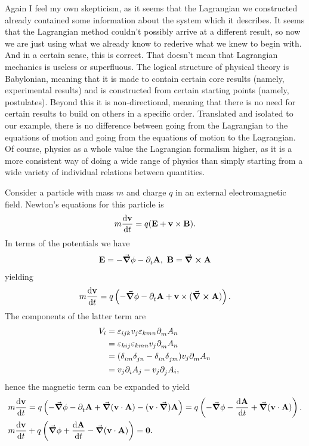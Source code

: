 Again I feel my own skepticism, as it seems that the Lagrangian we constructed already contained some information about the system which it describes. It seems that the Lagrangian method couldn't possibly arrive at a different result, so now we are just using what we already know to rederive what we knew to begin with. And in a certain sense, this is correct. That doesn't mean that Lagrangian mechanics is useless or superfluous. The logical structure of physical theory is Babylonian, meaning that it is made to contain certain core results (namely, experimental results) and is constructed from certain starting points (namely, postulates). Beyond this it is non-directional, meaning that there is no need for certain results to build on others in a specific order. Translated and isolated to our example, there is no difference between going from the Lagrangian to the equations of motion and going from the equations of motion to the Lagrangian. Of course, physics as a whole value the Lagrangian formalism higher, as it is a more consistent way of doing a wide range of physics than simply starting from a wide variety of individual relations between quantities.

Consider a particle with mass $m$ and charge $q$ in an external electromagnetic field. Newton's equations for this particle is
\begin{align*}
	m\dv{\vb{v}}{t} = q(\vb{E} + \vb{v}\times\vb{B}).
\end{align*}
In terms of the potentials we have
\begin{align*}
	\vb{E} = -\grad{\phi} - \partial^{}_{t}\vb{A},\ \vb{B} = \curl{\vb{A}}
\end{align*}
yielding
\begin{align*}
	m\dv{\vb{v}}{t} = q\left(-\grad{\phi} - \partial^{}_{t}\vb{A} + \vb{v}\times(\curl{\vb{A}})\right).
\end{align*}
The components of the latter term are
\begin{align}
	V_{i} &= \varepsilon_{ijk}v_{j}\varepsilon_{kmn}\partial^{}_{m}A_{n} \\
	      &= \varepsilon_{kij}\varepsilon_{kmn}v_{j}\partial^{}_{m}A_{n} \\
	      &= (\delta_{im}^{}\delta_{jn}^{} - \delta_{in}^{}\delta_{jm}^{})v_{j}\partial^{}_{m}A_{n} \\
	      &= v_{j}\partial^{}_{i}A_{j} - v_{j}\partial^{}_{j}A_{i},
\end{align}
hence the magnetic term can be expanded to yield
\begin{align*}
	&m\dv{\vb{v}}{t} = q\left(-\grad{\phi} - \partial^{}_{t}\vb{A} + \grad{(\vb{v}\cdot\vb{A})} - (\vb{v}\cdot\grad)\vb{A}\right) = q\left(-\grad{\phi} - \dv{\vb{A}}{t} + \grad{(\vb{v}\cdot\vb{A})}\right). \\
	&m\dv{\vb{v}}{t} + q\left(\grad{\phi} + \dv{\vb{A}}{t} - \grad{(\vb{v}\cdot\vb{A})}\right) = \vb{0}.
\end{align*}


